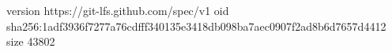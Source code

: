 version https://git-lfs.github.com/spec/v1
oid sha256:1adf3936f7277a76cdfff340135e3418db098ba7aec0907f2ad8b6d7657d4412
size 43802
